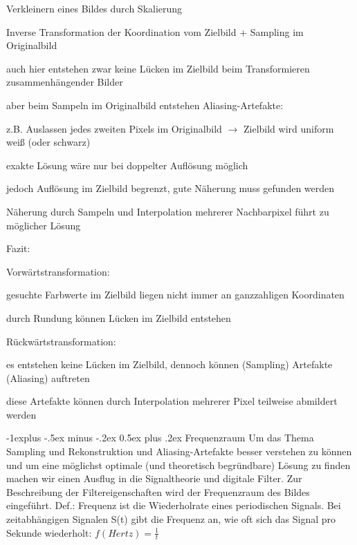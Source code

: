 \documentclass[landscape]{article}
\makeatletter
\renewcommand{\subsection}{\@startsection{subsection}{2}{0mm}%
                                {-1explus -.5ex minus -.2ex}%
                                {0.5ex plus .2ex}%
                                {\normalfont\normalsize\bfseries}}
\makeatother
\begin{document}
\begin{multicols}{3}
  Verkleinern eines Bildes durch Skalierung
  \begin{itemize*}
    \item Inverse Transformation der Koordination vom Zielbild + Sampling im Originalbild
    \begin{itemize*}
      \item auch hier entstehen zwar keine Lücken im Zielbild beim Transformieren zusammenhängender Bilder
      \item aber beim Sampeln im Originalbild entstehen Aliasing-Artefakte:
      \item z.B. Auslassen jedes zweiten Pixels im Originalbild $\rightarrow$ Zielbild wird uniform weiß (oder schwarz)
    \end{itemize*}
    \item exakte Lösung wäre nur bei doppelter Auflösung möglich
    \item jedoch Auflösung im Zielbild begrenzt, gute Näherung muss gefunden werden
    \item Näherung durch Sampeln und Interpolation mehrerer Nachbarpixel führt zu möglicher Lösung
  \end{itemize*}
  
  
  Fazit:
  \begin{itemize*}
    \item Vorwärtstransformation:
    \begin{itemize*}
      \item gesuchte Farbwerte im Zielbild liegen nicht immer an ganzzahligen Koordinaten
      \item durch Rundung können Lücken im Zielbild entstehen
    \end{itemize*}
    \item Rückwärtstransformation:
    \begin{itemize*}
      \item es entstehen keine Lücken im Zielbild, dennoch können (Sampling) Artefakte (Aliasing) auftreten
      \item diese Artefakte können durch Interpolation mehrerer Pixel teilweise abmildert werden
    \end{itemize*}
  \end{itemize*}
  
  
  \subsection{Frequenzraum}
  Um das Thema Sampling und Rekonstruktion und Aliasing-Artefakte besser verstehen zu können und um eine möglichst optimale (und theoretisch begründbare) Lösung zu finden machen wir einen Ausflug in die Signaltheorie und digitale Filter.
  Zur Beschreibung der Filtereigenschaften wird der Frequenzraum des Bildes eingeführt.
  Def.: Frequenz ist die Wiederholrate eines periodischen Signals. Bei zeitabhängigen Signalen S(t) gibt die Frequenz an, wie oft sich das Signal pro Sekunde wiederholt: $f(Hertz)=\frac{1}{t}$
  

\end{multicols}
\end{document}
